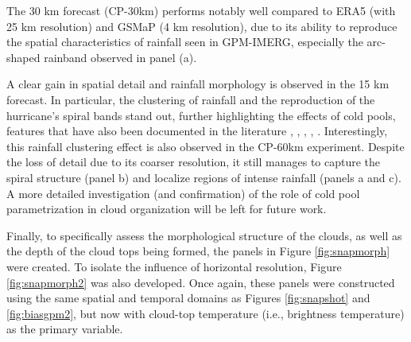 The 30 km forecast (CP-30km) performs notably well compared to ERA5 (with 25 km resolution) and GSMaP (4 km resolution), due to its ability to reproduce the spatial characteristics of rainfall seen in GPM-IMERG, especially the arc-shaped rainband observed in panel (a).

A clear gain in spatial detail and rainfall morphology is observed in the 15 km forecast. In particular, the clustering of rainfall and the reproduction of the hurricane's spiral bands stand out, further highlighting the effects of cold pools, features that have also been documented in the literature \cite{sakaeda2023observed}, \cite{freitas2024parameterization}, \cite{haerter2018reconciling}, \cite{feng2015mechanisms}, \cite{vogel2021climatology}. Interestingly, this rainfall clustering effect is also observed in the CP-60km experiment. Despite the loss of detail due to its coarser resolution, it still manages to capture the spiral structure (panel b) and localize regions of intense rainfall (panels a and c). A more detailed investigation (and confirmation) of the role of cold pool parametrization in cloud organization will be left for future work.

Finally, to specifically assess the morphological structure of the clouds, as well as the depth of the cloud tops being formed, the panels in Figure \ref{fig:snapmorph} were created. To isolate the influence of horizontal resolution, Figure \ref{fig:snapmorph2}  was also developed. Once again, these panels were constructed using the same spatial and temporal domains as Figures \ref{fig:snapshot} and \ref{fig:biasgpm2}, but now with cloud-top temperature (i.e., brightness temperature) as the primary variable.

